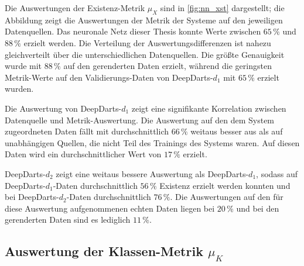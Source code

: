 Die Auswertungen der Existenz-Metrik $\mu_X$ sind in \autoref{fig:nn_xst} dargestellt; die Abbildung zeigt die Auswertungen der Metrik der Systeme auf den jeweiligen Datenquellen. Das neuronale Netz dieser Thesis konnte Werte zwischen $65\,\%$ und $88\,\%$ erzielt werden. Die Verteilung der Auswertungsdifferenzen ist nahezu gleichverteilt über die unterschiedlichen Datenquellen. Die größte Genauigkeit wurde mit $88\,\%$ auf den gerenderten Daten erzielt, während die geringsten Metrik-Werte auf den Validierungs-Daten von DeepDarts-$d_1$ mit $65\,\%$ erzielt wurden.

Die Auswertung von DeepDarts-$d_1$ zeigt eine signifikante Korrelation zwischen Datenquelle und Metrik-Auswertung. Die Auswertung auf den dem System zugeordneten Daten fällt mit durchschnittlich $66\,\%$ weitaus besser aus als auf unabhängigen Quellen, die nicht Teil des Trainings des Systems waren. Auf diesen Daten wird ein durchschnittlicher Wert von $17\,\%$ erzielt.

DeepDarts-$d_2$ zeigt eine weitaus bessere Auswertung als DeepDarts-$d_1$, sodass auf DeepDarts-$d_1$-Daten durchschnittlich $56\,\%$ Existenz erzielt werden konnten und bei DeepDarts-$d_2$-Daten durchschnittlich $76\,\%$. Die Auswertungen auf den für diese Auswertung aufgenommenen echten Daten liegen bei $20\,\%$ und bei den gerenderten Daten sind es lediglich $11\,\%$.


\subsection{Auswertung der Klassen-Metrik \texorpdfstring{$\mu_K$}{µ\_K}}
\label{sec:auswertung_cls}

\NNCls

